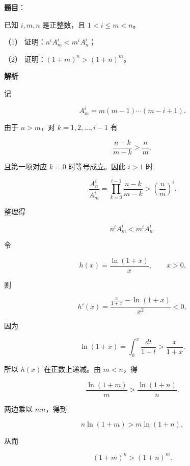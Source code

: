 \begin{answer}

\textbf{题目}：

已知 $i,m,n$ 是正整数，且 $1<i\le m<n$。

（1） 证明：$n^iA_m^i<m^iA_n^i$；

（2） 证明：$(1+m)^n>(1+n)^m$。

\textbf{解析}

记

\nopagebreak[4]
\[
A_m^i=m(m-1)\cdots(m-i+1).
\]


由于 $n>m$，对 $k=1,2,\ldots,i-1$ 有

\nopagebreak[4]
\[
\frac{n-k}{m-k}>\frac nm,
\]

且第一项对应 $k=0$ 时等号成立。因此 $i>1$ 时

\nopagebreak[4]
\[
\frac{A_n^i}{A_m^i}
=\prod_{k=0}^{i-1}\frac{n-k}{m-k}
>\left(\frac nm\right)^i.
\]

整理得

\nopagebreak[4]
\[
n^iA_m^i<m^iA_n^i.
\]


令

\nopagebreak[4]
\[
h(x)=\frac{\ln(1+x)}x,\qquad x>0.
\]

则

\nopagebreak[4]
\[
h'(x)=\frac{\frac{x}{1+x}-\ln(1+x)}{x^2}<0,
\]

因为

\nopagebreak[4]
\[
\ln(1+x)=\int_0^x\frac{dt}{1+t}>\frac{x}{1+x}.
\]

所以 $h(x)$ 在正数上递减。由 $m<n$，得

\nopagebreak[4]
\[
\frac{\ln(1+m)}m>\frac{\ln(1+n)}n.
\]

两边乘以 $mn$，得到

\nopagebreak[4]
\[
n\ln(1+m)>m\ln(1+n),
\]

从而

\nopagebreak[4]
\[
(1+m)^n>(1+n)^m.
\]



\end{answer}
